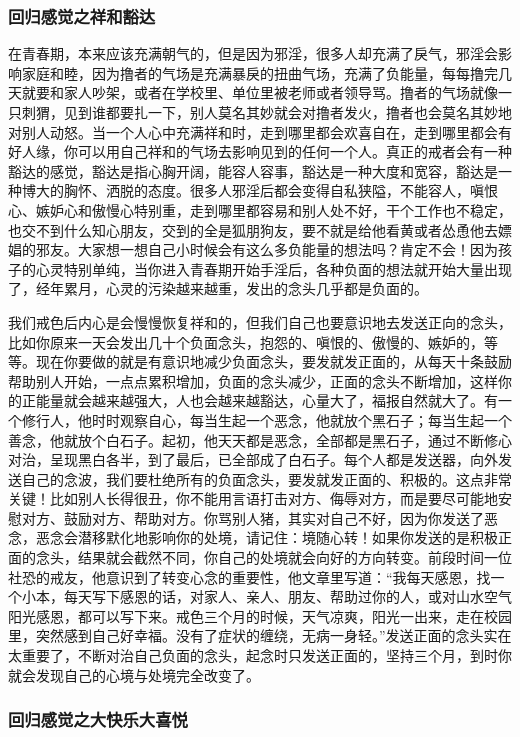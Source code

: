 \subsubsection{回归感觉之祥和豁达}

在青春期，本来应该充满朝气的，但是因为邪淫，很多人却充满了戾气，邪淫会影响家庭和睦，因为撸者的气场是充满暴戾的扭曲气场，充满了负能量，每每撸完几天就要和家人吵架，或者在学校里、单位里被老师或者领导骂。撸者的气场就像一只刺猬，见到谁都要扎一下，别人莫名其妙就会对撸者发火，撸者也会莫名其妙地对别人动怒。当一个人心中充满祥和时，走到哪里都会欢喜自在，走到哪里都会有好人缘，你可以用自己祥和的气场去影响见到的任何一个人。真正的戒者会有一种豁达的感觉，豁达是指心胸开阔，能容人容事，豁达是一种大度和宽容，豁达是一种博大的胸怀、洒脱的态度。很多人邪淫后都会变得自私狭隘，不能容人，嗔恨心、嫉妒心和傲慢心特别重，走到哪里都容易和别人处不好，干个工作也不稳定，也交不到什么知心朋友，交到的全是狐朋狗友，要不就是给他看黄或者怂恿他去嫖娼的邪友。大家想一想自己小时候会有这么多负能量的想法吗？肯定不会！因为孩子的心灵特别单纯，当你进入青春期开始手淫后，各种负面的想法就开始大量出现了，经年累月，心灵的污染越来越重，发出的念头几乎都是负面的。

我们戒色后内心是会慢慢恢复祥和的，但我们自己也要意识地去发送正向的念头，比如你原来一天会发出几十个负面念头，抱怨的、嗔恨的、傲慢的、嫉妒的，等等。现在你要做的就是有意识地减少负面念头，要发就发正面的，从每天十条鼓励帮助别人开始，一点点累积增加，负面的念头减少，正面的念头不断增加，这样你的正能量就会越来越强大，人也会越来越豁达，心量大了，福报自然就大了。有一个修行人，他时时观察自心，每当生起一个恶念，他就放个黑石子；每当生起一个善念，他就放个白石子。起初，他天天都是恶念，全部都是黑石子，通过不断修心对治，呈现黑白各半，到了最后，已全部成了白石子。每个人都是发送器，向外发送自己的念波，我们要杜绝所有的负面念头，要发就发正面的、积极的。这点非常关键！比如别人长得很丑，你不能用言语打击对方、侮辱对方，而是要尽可能地安慰对方、鼓励对方、帮助对方。你骂别人猪，其实对自己不好，因为你发送了恶念，恶念会潜移默化地影响你的处境，请记住：境随心转！如果你发送的是积极正面的念头，结果就会截然不同，你自己的处境就会向好的方向转变。前段时间一位社恐的戒友，他意识到了转变心念的重要性，他文章里写道：“我每天感恩，找一个小本，每天写下感恩的话，对家人、亲人、朋友、帮助过你的人，或对山水空气阳光感恩，都可以写下来。戒色三个月的时候，天气凉爽，阳光一出来，走在校园里，突然感到自己好幸福。没有了症状的缠绕，无病一身轻。”发送正面的念头实在太重要了，不断对治自己负面的念头，起念时只发送正面的，坚持三个月，到时你就会发现自己的心境与处境完全改变了。

\subsubsection{回归感觉之大快乐大喜悦}

